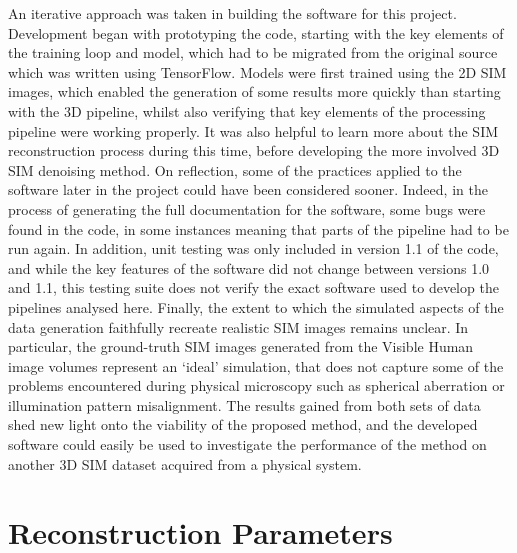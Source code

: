 \documentclass[12pt]{article}
\begin{document}
An iterative approach was taken in building the software for this project.
Development began with prototyping the code, starting with the key elements of the training loop and model,
which had to be migrated from the original source which was written using TensorFlow.
Models were first trained using the 2D SIM images,
which enabled the generation of some results more quickly than starting with the 3D pipeline,
whilst also verifying that key elements of the processing pipeline were working properly.
It was also helpful to learn more about the SIM reconstruction process during this time,
before developing the more involved 3D SIM denoising method.
On reflection, some of the practices applied to the software later in the project could have been considered sooner.
Indeed, in the process of generating the full documentation for the software,
some bugs were found in the code, in some instances meaning that parts of the pipeline had to be run again.
In addition, unit testing was only included in version 1.1 of the code,
and while the key features of the software did not change between versions 1.0 and 1.1,
this testing suite does not verify the exact software used to develop the pipelines analysed here.
Finally, the extent to which the simulated aspects of the data generation faithfully recreate realistic SIM images remains unclear.
In particular, the ground-truth SIM images generated from the Visible Human image volumes represent an `ideal' simulation,
that does not capture some of the problems encountered during physical microscopy such as spherical aberration or illumination pattern misalignment.
The results gained from both sets of data shed new light onto the viability of the proposed method,
and the developed software could easily be used to investigate the performance of the method on another 3D SIM dataset acquired from a physical system.

\newpage




\newpage

\appendix

\section{Reconstruction Parameters}
\end{document}
